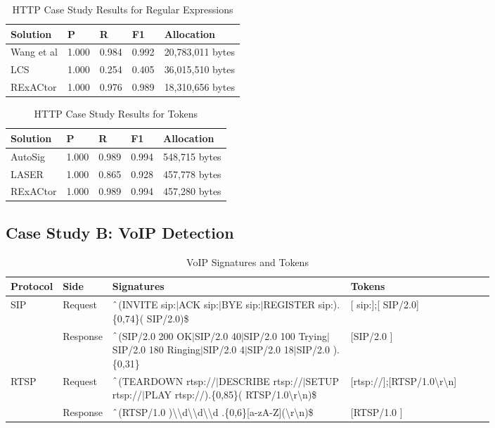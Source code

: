 \begin{table}[H]
  \centering
  \begin{tabular}{|l|l|l|l|l|}
   \hline
   Solution & P & R & F1 & Allocation \\
   \hline\hline
   Wang et al & 1.000 & 0.984 & 0.992 & 20,783,011 bytes\\
   LCS & 1.000 & 0.254 & 0.405 & 36,015,510 bytes \\
   RExACtor & 1.000 & 0.976 & 0.989 & 18,310,656 bytes\\

   \hline
  \end{tabular}
  \caption{HTTP Case Study Results for Regular Expressions}
  \label{table:httpprecisionregex}
\end{table}

\begin{table}[H]
  \centering
  \begin{tabular}{|l|l|l|l|l|}
   \hline
   Solution & P & R & F1 & Allocation \\
   \hline\hline
   AutoSig & 1.000 & 0.989 & 0.994 & 548,715 bytes \\
   LASER & 1.000 & 0.865 & 0.928 & 457,778 bytes \\
   RExACtor & 1.000 & 0.989 & 0.994 & 457,280 bytes \\
   \hline
  \end{tabular}
  \caption{HTTP Case Study Results for Tokens}
  \label{table:httpprecisiontokens}
\end{table}

\subsection{Case Study B: VoIP Detection}
\begin{table*}[t]
  \centering
  \begin{tabular}{|l|l|p{0.5\linewidth}|p{0.3\linewidth}|}
   \hline
   Protocol & Side & Signatures & Tokens \\ [0.5ex]
   \hline\hline
   SIP & Request & $\string^$(INVITE sip:$\vert$ACK sip:$\vert$BYE sip:$\vert$REGISTER sip:).\{0,74\}( SIP/2.0)\$ & [ sip:];[ SIP/2.0] \\
   \cline{2-4}
   & Response & $\string^$(SIP/2.0 200 OK$\vert$SIP/2.0 40$\vert$SIP/2.0 100 Trying$\vert$SIP/2.0 180 Ringing$\vert$SIP/2.0 4$\vert$SIP/2.0 18$\vert$SIP/2.0 ).\{0,31\} & [SIP/2.0 ] \\
  \hline
  RTSP & Request & $\string^$(TEARDOWN rtsp://$\vert$DESCRIBE rtsp://$\vert$SETUP rtsp://$\vert$PLAY rtsp://).\{0,85\}( RTSP/1.0\textbackslash r\textbackslash n)\$ & [rtsp://];[RTSP/1.0\textbackslash r\textbackslash n] \\
  \cline{2-4}
  & Response & $\string^$(RTSP/1.0 )\textbackslash\textbackslash d\textbackslash\textbackslash d\textbackslash\textbackslash d .\{0,6\}[a-zA-Z](\textbackslash r\textbackslash n)\$ & [RTSP/1.0 ] \\
  \hline
  \end{tabular}
  \caption{VoIP Signatures and Tokens}
  \label{table:voip}
\end{table*}

